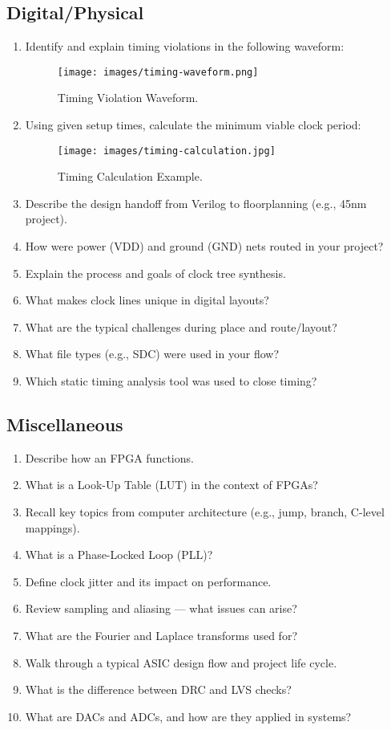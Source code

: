 \subsection*{Digital/Physical}
\begin{enumerate}
    \item Identify and explain timing violations in the following waveform:
        \begin{figure}[H]
            \centering
            \texttt{[image: images/timing-waveform.png]}
            \caption{Timing Violation Waveform.}
        \end{figure}
    \item Using given setup times, calculate the minimum viable clock period:
        \begin{figure}[H]
            \centering
            \texttt{[image: images/timing-calculation.jpg]}
            \caption{Timing Calculation Example.}
        \end{figure}
    \item Describe the design handoff from Verilog to floorplanning (e.g., 45nm project).
    \item How were power (VDD) and ground (GND) nets routed in your project?
    \item Explain the process and goals of clock tree synthesis.
    \item What makes clock lines unique in digital layouts?
    \item What are the typical challenges during place and route/layout?
    \item What file types (e.g., SDC) were used in your flow?
    \item Which static timing analysis tool was used to close timing?
\end{enumerate}

\subsection*{Miscellaneous}
\begin{enumerate}
    \item Describe how an FPGA functions.
    \item What is a Look-Up Table (LUT) in the context of FPGAs?
    \item Recall key topics from computer architecture (e.g., jump, branch, C-level mappings).
    \item What is a Phase-Locked Loop (PLL)?
    \item Define clock jitter and its impact on performance.
    \item Review sampling and aliasing — what issues can arise?
    \item What are the Fourier and Laplace transforms used for?
    \item Walk through a typical ASIC design flow and project life cycle.
    \item What is the difference between DRC and LVS checks?
    \item What are DACs and ADCs, and how are they applied in systems?
\end{enumerate}
